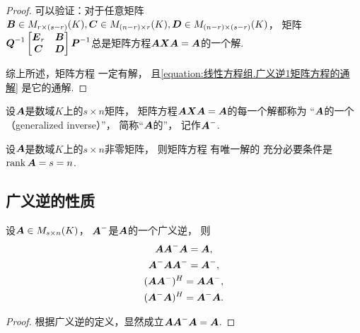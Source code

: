 \begin{theorem}[广义逆存在定理]
\begin{proof}
可以验证：对于任意矩阵\(
	\boldsymbol{B} \in M_{r \times (s-r)}(K),
	\boldsymbol{C} \in M_{(n-r) \times r}(K),
	\boldsymbol{D} \in M_{(n-r) \times (s-r)}(K)
\)，
矩阵\(
	\boldsymbol{Q}^{-1}
	\begin{bmatrix}
		\boldsymbol{E}_r & \boldsymbol{B} \\
		\boldsymbol{C} & \boldsymbol{D}
	\end{bmatrix}
	\boldsymbol{P}^{-1}
\)总是矩阵方程\(\boldsymbol{A} \boldsymbol{X} \boldsymbol{A} = \boldsymbol{A}\)的一个解.

综上所述，矩阵方程  一定有解，
且\cref{equation:线性方程组.广义逆1矩阵方程的通解} 是它的通解.
\end{proof}
\end{theorem}

\begin{definition}
设\(\boldsymbol{A}\)是数域\(K\)上的\(s \times n\)矩阵，
矩阵方程\(\boldsymbol{A} \boldsymbol{X} \boldsymbol{A} = \boldsymbol{A}\)的每一个解都称为
“\(\boldsymbol{A}\)的一个（generalized inverse）”，
简称“\(\boldsymbol{A}\)的”，
记作\(\boldsymbol{A}^-\).
\end{definition}

\begin{corollary}
设\(\boldsymbol{A}\)是数域\(K\)上的\(s \times n\)非零矩阵，
则矩阵方程  有唯一解的
充分必要条件是\(\rank\boldsymbol{A} = s = n\).
\end{corollary}

\subsection{广义逆的性质}
\begin{property}\label{theorem:线性方程组.广义逆的性质1}
设\(\boldsymbol{A} \in M_{s \times n}(K)\)，
\(\boldsymbol{A}^-\)是\(\boldsymbol{A}\)的一个广义逆，
则\begin{gather}
	\boldsymbol{A} \boldsymbol{A}^-\boldsymbol{A} = \boldsymbol{A}, \\
	\boldsymbol{A}^-\boldsymbol{A} \boldsymbol{A}^- = \boldsymbol{A}^-, \\
	(\boldsymbol{A} \boldsymbol{A}^-)^H = \boldsymbol{A} \boldsymbol{A}^-, \\
	(\boldsymbol{A}^-\boldsymbol{A})^H = \boldsymbol{A}^-\boldsymbol{A}.
\end{gather}
\begin{proof}
根据广义逆的定义，显然成立\(\boldsymbol{A} \boldsymbol{A}^-\boldsymbol{A} = \boldsymbol{A}\).
\end{proof}
\end{property}

